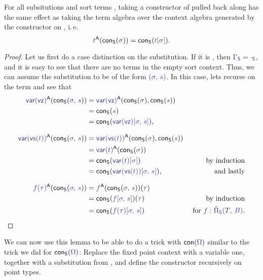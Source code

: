 \begin{lemma}\label{lem:if-ex-cont}
For all subsitutions \tqm{\IFSub{\sigma}{\Gamma_\Sc}{\Delta_\Sc}} and sort terms
, taking a constructor of  pulled back
along \tqm{\sigma} has the same effect as taking the term algebra over the context
algebra generated by the constructor on \tqm{\sigma}, i.\,e.
\begin{equation*}
\tqm{t}^\CC(\IFconS{\sigma}) = \IFconS{t[\sigma]} \text{.}
\end{equation*}
\end{lemma}

\begin{proof}
Let us first do a case distinction on the substitution.
If it is \tqm{\epsilon}, then $\tqm{\Gamma_\Sc} = \tqm{\cdot_\Sc} $,
and it is easy to see that there are no terms in the empty sort context.
Thus, we can assume the substitution to be of the form $\tqm{(\sigma,\, s)}$.
In this case, lets recurse on the term and see that
\begin{align*}
\tqm{\var(\vz)}^\CC(\IFconS{\sigma,\, s})
  &= \tqm{\var(\vz)}^\CC(\IFconS{\sigma}, \IFconS{s}) \\
  &= \IFconS{s} \\
  &= \IFconS{\var(\vz)[\sigma,\, s]} \text{,} \\[.7em]
\tqm{\var(\vs(t))}^\CC(\IFconS{\sigma,\, s})
  &= \tqm{\var(\vs(t))}^\CC(\IFconS{\sigma}, \IFconS{s}) \\
  &= \tqm{\var(t)}^\CC(\IFconS{\sigma}) \\
  &= \IFconS{\var(t)[\sigma]} & \text{ by induction} \\
  &= \IFconS{\var(\vs(t))[\sigma,\, s]} \text, & \text{ and lastly} \\[.7em]
\tqm{f(\bltau)}^\CC(\IFconS{\sigma,\, s})
  &= \tqm{f}^\CC(\IFconS{\sigma,\, s})(\bltau) \\
  &= \IFconS{f[\sigma,\, s]}(\bltau) & \text{ by induction} \\
  &= \IFconS{f(\bltau)[\sigma,\, s]} & \text{ for \tqm{f : \ExtPiS{T}{B}}.}
\end{align*}
\end{proof}

We can now use this lemma to be able to do a trick with $\IFcon{\Omega}$ similar
to the trick we did for $\IFconS{\Omega}$:
Replace the fixed point context with a variable one, together with a substitution
from \tqm{\Omega}, and define the constructor recursively on point types.

